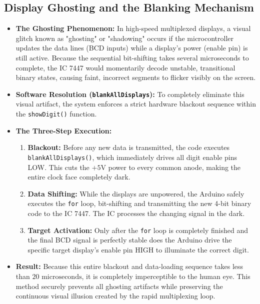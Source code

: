 \documentclass[journal,12pt,onecolumn]{IEEEtran}
\begin{document}
		\subsection*{Display Ghosting and the Blanking Mechanism}
		\begin{itemize}
			\item \textbf{The Ghosting Phenomenon:} In high-speed multiplexed displays, a visual glitch known as "ghosting" or "shadowing" occurs if the microcontroller updates the data lines (BCD inputs) while a display's power (enable pin) is still active. Because the sequential bit-shifting takes several microseconds to complete, the IC 7447 would momentarily decode unstable, transitional binary states, causing faint, incorrect segments to flicker visibly on the screen.
			
			\item \textbf{Software Resolution (\texttt{blankAllDisplays}):} To completely eliminate this visual artifact, the system enforces a strict hardware blackout sequence within the \texttt{showDigit()} function. 
			
			\item \textbf{The Three-Step Execution:}
			\begin{enumerate}
				\item \textbf{Blackout:} Before any new data is transmitted, the code executes \texttt{blankAllDisplays()}, which immediately drives all digit enable pins LOW. This cuts the $+5\text{V}$ power to every common anode, making the entire clock face completely dark.
				\item \textbf{Data Shifting:} While the displays are unpowered, the Arduino safely executes the \texttt{for} loop, bit-shifting and transmitting the new 4-bit binary code to the IC 7447. The IC processes the changing signal in the dark.
				\item \textbf{Target Activation:} Only after the \texttt{for} loop is completely finished and the final BCD signal is perfectly stable does the Arduino drive the specific target display's enable pin HIGH to illuminate the correct digit.
			\end{enumerate}
			
			\item \textbf{Result:} Because this entire blackout and data-loading sequence takes less than $20\text{ microseconds}$, it is completely imperceptible to the human eye. This method securely prevents all ghosting artifacts while preserving the continuous visual illusion created by the rapid multiplexing loop.
		\end{itemize}
		\vspace{0.5cm}
		
\end{document}
